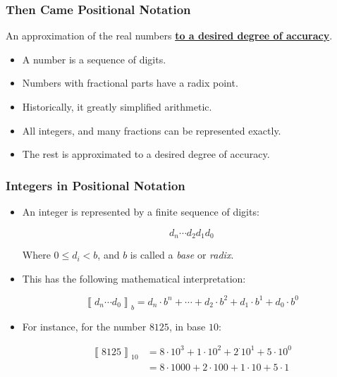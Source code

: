 \begin{frame}

\frametitle{Then Came Positional Notation}

\begin{center}

An approximation of the real numbers \textbf{\underline{to a desired degree of
accuracy}}.

\end{center}

\begin{itemize}

\item A number is a sequence of digits.

\item Numbers with fractional parts have a radix point.

\item Historically, it greatly simplified arithmetic.

\item All integers, and many fractions can be represented exactly.

\item The rest is approximated to a desired degree of accuracy.

\end{itemize}

\end{frame}

\begin{frame}

\frametitle{Integers in Positional Notation}

\begin{itemize}

\item An integer is represented by a finite sequence of digits:

\[
d_n \cdots d_2 d_1 d_0
\]

Where $0 \leq d_i < b$, and $b$ is called a \emph{base} or \emph{radix}.

\item This has the following mathematical interpretation:

\[
\left\llbracket d_n \cdots d_0 \right\rrbracket_b =
d_n \cdot b^n + \cdots + d_2 \cdot b^2 + d_1 \cdot b^1 + d_0 \cdot b^0
\]

\item For instance, for the number $8125$, in base $10$:

\begin{align*}
\left\llbracket 8125 \right\rrbracket_{10} &=
8 \cdot 10^3 + 1 \cdot 10^2 + 2^\cdot 10^1 + 5 \cdot 10^0 \\
&= 8\cdot 1000 + 2 \cdot 100 + 1 \cdot 10 + 5 \cdot 1
\end{align*}

\end{itemize}

\end{frame}

